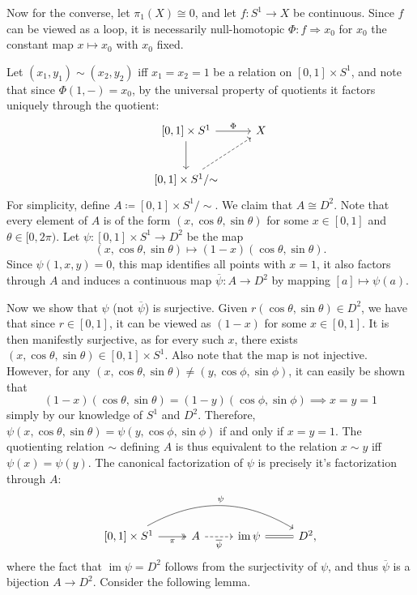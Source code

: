 \documentclass[11pt, letterpaper]{article}
\DeclareMathOperator{\im}{im}
\newcommand{\tildesim}{\mathbin{\sim}}
\begin{document}
Now for the converse, let $\pi _1(X)\cong 0$, and let $f : S^1 \to X$ be continuous. Since $f$ can be viewed as a loop, it is necessarily null-homotopic $\Phi :f\Rightarrow x_0$ for $x_0$ the constant map $x\mapsto x_0$ with $x_0$ fixed.

Let $(x_1,y_1)\sim (x_2,y_2)$ iff $x_1=x_2=1$ be a relation on $[0,1]\times S^1$, and note that since $\Phi (1,-)=x_0$, by the universal property of quotients it factors uniquely through the quotient:
\[\begin{tikzcd}[row sep = 2.5em, column sep = 2.5em]
\left[ 0,1 \right] \times S^1\ar[" \Phi  ", r]\ar[d]  & X \\
\left[ 0,1 \right] \times S^1/\tildesim \ar[dashed, ur]  & 
\end{tikzcd}\]
For simplicity, define $A\coloneqq [0,1]\times S^1/\tildesim $. We claim that $A\cong D^2$. Note that every element of $A$ is of the form $(x,\cos \theta ,\sin \theta )$ for some $x\in [0,1]$ and $\theta \in [0,2\pi )$. Let $\psi : [0,1]\times S^1 \to D^2$ be the map
\[
	(x,\cos \theta ,\sin \theta )\mapsto (1-x)(\cos \theta ,\sin \theta )
.\]
Since $\psi (1,x,y)=0$, this map identifies all points with $x=1$, it also factors through $A$ and induces a continuous map $\overline{\psi } : A \to D^2$ by mapping $[a]\mapsto \psi (a)$.

Now we show that $\psi $ (not $\overline{\psi } $) is surjective. Given $r(\cos \theta ,\sin \theta )\in D^2$, we have that since $r\in [0,1]$, it can be viewed as $(1-x)$ for some $x\in [0,1]$. It is then manifestly surjective, as for every such $x$, there exists $(x,\cos \theta ,\sin \theta )\in [0,1]\times S^1$. Also note that the map is not injective. However, for any $(x,\cos \theta ,\sin \theta )\neq (y,\cos \phi ,\sin \phi )$, it can easily be shown that
\[
	(1-x)(\cos \theta ,\sin \theta )=(1-y)(\cos \phi ,\sin \phi )\implies x=y=1
\]
simply by our knowledge of $S^1$ and $D^2$. Therefore, $\psi (x,\cos \theta ,\sin \theta )=\psi (y,\cos \phi ,\sin \phi )$ if and only if $x=y=1$. The quotienting relation $\sim $ defining $A$ is thus equivalent to the relation $x\sim y$ iff $\psi (x)=\psi (y)$. The canonical factorization of $\psi $ is precisely it's factorization through $A$:
\[\begin{tikzcd}[row sep = 2.5em, column sep = 2.5em]
	\left[ 0,1 \right] \times S^1\ar[" \psi  ", bend left, rrr] \ar[" \pi  "', two heads, r]  & A\ar[" \overline{\psi }  "', dashed, r]  & \im \psi \ar[equals, r] &D^2,
\end{tikzcd}\]
where the fact that $\im \psi = D^2$ follows from the surjectivity of $\psi $, and thus $\overline{\psi } $ is a bijection $A\to D^2$. Consider the following lemma.
\end{document}
